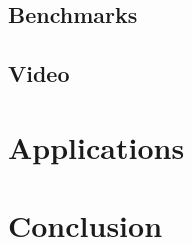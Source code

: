 \documentclass{acmsiggraph}
\begin{document}
\subsection{Benchmarks}

\subsection{Video}

\section{Applications}

\section{Conclusion}


\nocite{*}

\end{document}
